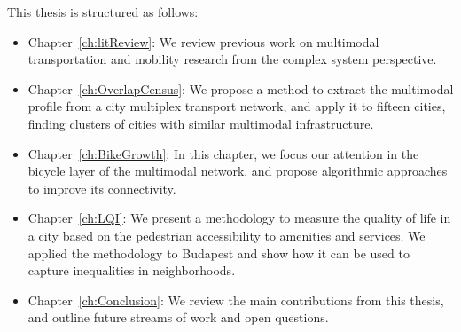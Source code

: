 This thesis is structured as follows:

\begin{itemize}
    \item Chapter~\ref{ch:litReview}: We review previous work on multimodal transportation and mobility research from the complex system perspective.
    \item Chapter~\ref{ch:OverlapCensus}: We propose a method to extract the multimodal profile from a city multiplex transport network, and apply it to fifteen cities, finding clusters of cities with similar multimodal infrastructure.
    \item Chapter~\ref{ch:BikeGrowth}: In this chapter, we focus our attention in the bicycle layer of the multimodal network, and propose algorithmic approaches to improve its connectivity.
    \item Chapter~\ref{ch:LQI}: We present a methodology to measure the quality of life in a city based on the pedestrian accessibility to amenities and services. We applied the methodology to Budapest and show how it can be used to capture inequalities in neighborhoods. 
    \item Chapter~\ref{ch:Conclusion}: We review the main contributions from this thesis, and outline future streams of work and open questions. 
\end{itemize}



